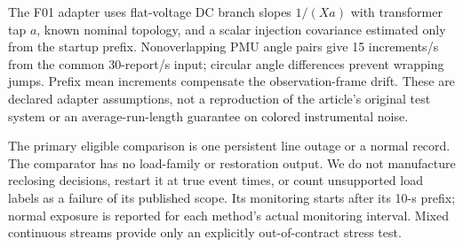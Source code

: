 The F01 adapter uses flat-voltage DC branch slopes $1/(X a)$ with transformer tap $a$, known nominal topology, and a scalar injection covariance estimated only from the startup prefix. Nonoverlapping PMU angle pairs give 15 increments/s from the common 30-report/s input; circular angle differences prevent wrapping jumps. Prefix mean increments compensate the observation-frame drift. These are declared adapter assumptions, not a reproduction of the article's original test system or an average-run-length guarantee on colored instrumental noise.

The primary eligible comparison is one persistent line outage or a normal record. The comparator has no load-family or restoration output. We do not manufacture reclosing decisions, restart it at true event times, or count unsupported load labels as a failure of its published scope. Its monitoring starts after its 10-s prefix; normal exposure is reported for each method's actual monitoring interval. Mixed continuous streams provide only an explicitly out-of-contract stress test.
